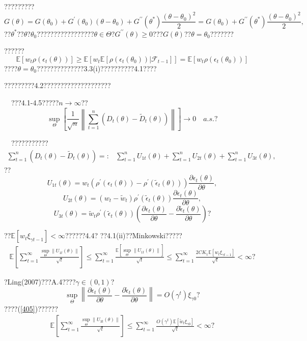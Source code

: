 \documentclass[a4paper,12pt,openany,oneside,utf-8]{ctexbook}
\newcommand{\xiaosihao}{\fontsize{12pt}{\baselineskip}\selectfont}
\begin{document}
	\noindent ?????????
	$$G(\theta)=G(\theta_0)+G^{\prime}(\theta_0)(\theta-\theta_0)+G^{\prime\prime}(\theta^*)\frac{(\theta-\theta_0)^2}{2}=G(\theta_0) +G^{\prime\prime}(\theta^*)\frac{(\theta-\theta_0)^2}{2},$$
	??$\theta^*$??$\theta$?$\theta_0$?????????????????$\theta\in \Theta$?$G^{\prime\prime}(\theta)\ge 0$???$G(\theta)$??$\theta=\theta_0$???????
	
	??????
	$$\mathbb{E}\left[w_t\rho(\epsilon_t(\theta))\right]\ge \mathbb{E}\left[w_t\mathbb{E}\left[\rho(\epsilon_t(\theta_0))|\mathcal{F}_{t-1}\right]\right]=\mathbb{E}\left[w_t\rho(\epsilon_t(\theta_0))\right]$$
	????$\theta=\theta_0$??????????????3.3(i)??????????4.1????
	
	?????????4.2????????????????????
	
	\noindent{\xiaosihao\heiti ??~4.2}~~???4.1-4.5?????$n\rightarrow \infty$??
	$$
	\sup _{\Theta}\left[\frac{1}{\sqrt{n}}\left\|\sum_{t=1}^n\left(D_t(\theta)-\tilde{D}_t(\theta)\right)\right\|\right] \rightarrow 0 \quad a.s.\mbox{?}
	$$
	
	\noindent{\xiaosihao\heiti ??~4.2??}~~???????????
	\begin{align}
		\sum_{t=1}^n\left(D_t(\theta)-\tilde{D}_t(\theta)\right)=:&\sum_{t=1}^nU_{1t}(\theta)+\sum_{t=1}^nU_{2t}(\theta)+\sum_{t=1}^nU_{3t}(\theta),\nonumber
	\end{align}
	??
	$$U_{1t}(\theta)=w_t\left(\rho^{\prime}(\epsilon_t(\theta))-\rho^{\prime}(\tilde{\epsilon}_t(\theta))\right)\frac{\partial \epsilon_{t}(\theta)}{\partial \theta} ,$$
	$$U_{2t}(\theta)=\left(w_t-\tilde {w}_t\right)\rho^{\prime}(\tilde{\epsilon}_t(\theta))\frac{\partial \epsilon_{t}(\theta)}{\partial \theta} ,$$
	$$U_{3t}(\theta)=\tilde {w}_t\rho^{\prime}(\tilde{\epsilon}_t(\theta))\left(\frac{\partial \epsilon_{t}(\theta)}{\partial \theta}-\frac{\partial \tilde{\epsilon}_{t}(\theta)}{\partial \theta}\right)\mbox{?}$$
	
	\noindent ??$\mathbb{E}\left[w_t\xi_{\gamma t-1}\right]<\infty$??????4.4? ??4.1(ii)??Minkowski?????
	\begin{align}\label{405}
		\mathbb{E}\left[\sum_{t=1}^{\infty} \frac{\sup _{\Theta}\left\|U_{1 t}(\theta)\right\|}{\sqrt{t}}\right]\le \sum_{t=1}^{\infty}\frac{\mathbb{E}\left[\sup _{\Theta}\left\|U_{1 t}(\theta)\right\|\right]}{\sqrt{t}} \le \sum_{t=1}^{\infty}\frac{2CK_1\mathbb{E}\left[w_t\xi_{\gamma t-1}\right]}{\sqrt{t}}< \infty\mbox{?}
	\end{align}
	
	\noindent ?Ling(2007)???A.4????$\gamma\in(0,1)$?
	$$
	\sup _{\Theta}\left\|\frac{\partial \epsilon_{t}(\theta)}{\partial \theta}-\frac{\partial \tilde{\epsilon}_{t}(\theta)}{\partial \theta}\right\|=O\left(\gamma^{t}\right) \xi_{\gamma 0}\mbox{?}
	$$
	\noindent ????(\ref{405})??????
	\begin{align}\label{406}
		\mathbb{E}\left[\sum_{t=1}^{\infty} \frac{\sup _{\Theta}\left\|U_{3 t}(\theta)\right\|}{\sqrt{t}}\right]\le \sum_{t=1}^{\infty}\frac{O\left(\gamma^{t}\right)\mathbb{E}\left[\tilde{w}_t\xi_{\gamma 0}\right]}{\sqrt{t}}< \infty\mbox{?}
	\end{align}
	
\end{document}
